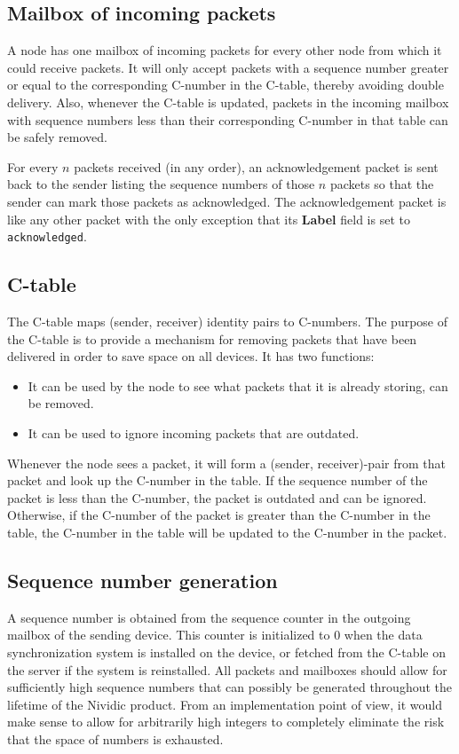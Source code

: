 \documentclass{article}
\begin{document}
\subsection{Mailbox of incoming packets}
A node has one mailbox of incoming packets for every other node from which it could receive packets. It will only accept packets with a sequence number greater or equal to the corresponding C-number in the C-table, thereby avoiding double delivery. Also, whenever the C-table is updated, packets in the incoming mailbox with sequence numbers less than their corresponding C-number in that table can be safely removed. 

For every $n$ packets received (in any order), an acknowledgement packet is sent back to the sender listing the sequence numbers of those $n$ packets so that the sender can mark those packets as acknowledged. The acknowledgement packet is like any other packet with the only exception that its \textbf{Label} field is set to \texttt{acknowledged}.

\subsection{C-table}
The C-table maps (sender, receiver) identity pairs to C-numbers. The purpose of the C-table is to provide a mechanism for removing packets that have been delivered in order to save space on all devices. It has two functions:
\begin{itemize}
  \item It can be used by the node to see what packets that it is already storing, can be removed.
  \item It can be used to ignore incoming packets that are outdated.
\end{itemize}
Whenever the node sees a packet, it will form a (sender, receiver)-pair from that packet and look up the C-number in the table. If the sequence number of the packet is less than the C-number, the packet is outdated and can be ignored. Otherwise, if the C-number of the packet is greater than the C-number in the table, the C-number in the table will be updated to the C-number in the packet.

\subsection{Sequence number generation}
A sequence number is obtained from the sequence counter in the outgoing mailbox of the sending device. This counter is initialized to 0 when the data synchronization system is installed on the device, or fetched from the C-table on the server if the system is reinstalled. All packets and mailboxes should allow for sufficiently high sequence numbers that can possibly be generated throughout the lifetime of the Nividic product. From an implementation point of view, it would make sense to allow for arbitrarily high integers to completely eliminate the risk that the space of numbers is exhausted.
\end{document}
